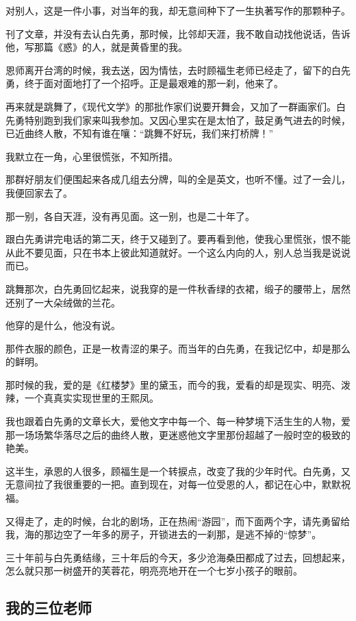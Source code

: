 \par 对别人，这是一件小事，对当年的我，却无意间种下了一生执著写作的那颗种子。
\par 刊了文章，并没有去认白先勇，那时候，比邻却天涯，我不敢自动找他说话，告诉他，写那篇《惑》的人，就是黄昏里的我。
\par 恩师离开台湾的时候，我去送，因为情怯，去时顾福生老师已经走了，留下的白先勇，终于面对面地打了一个招呼。正是最艰难的那一刹，他来了。
\par 再来就是跳舞了，《现代文学》的那批作家们说要开舞会，又加了一群画家们。白先勇特别跑到我们家来叫我参加。又因心里实在是太怕了，鼓足勇气进去的时候，已近曲终人散，不知有谁在嚷：“跳舞不好玩，我们来打桥牌！”
\par 我默立在一角，心里很慌张，不知所措。
\par 那群好朋友们便围起来各成几组去分牌，叫的全是英文，也听不懂。过了一会儿，我便回家去了。
\par 那一别，各自天涯，没有再见面。这一别，也是二十年了。
\par 跟白先勇讲完电话的第二天，终于又碰到了。要再看到他，使我心里慌张，恨不能从此不要见面，只在书本上彼此知道就好。一个这么内向的人，别人总当我是说说而已。
\par 跳舞那次，白先勇回忆起来，说我穿的是一件秋香绿的衣裙，缎子的腰带上，居然还别了一大朵绒做的兰花。
\par 他穿的是什么，他没有说。
\par 那件衣服的颜色，正是一枚青涩的果子。而当年的白先勇，在我记忆中，却是那么的鲜明。
\par 那时候的我，爱的是《红楼梦》里的黛玉，而今的我，爱看的却是现实、明亮、泼辣，一个真真实实现世里的王熙凤。
\par 我也跟着白先勇的文章长大，爱他文字中每一个、每一种梦境下活生生的人物，爱那一场场繁华落尽之后的曲终人散，更迷惑他文字里那份超越了一般时空的极致的艳美。
\par 这半生，承恩的人很多，顾福生是一个转捩点，改变了我的少年时代。白先勇，又无意间拉了我很重要的一把。直到现在，对每一位受恩的人，都记在心中，默默祝福。
\par 又得走了，走的时候，台北的剧场，正在热闹“游园”，而下面两个字，请先勇留给我，海的那边空了一年多的房子，开锁进去的一刹那，是逃不掉的“惊梦”。
\par 三十年前与白先勇结缘，三十年后的今天，多少沧海桑田都成了过去，回想起来，怎么就只那一树盛开的芙蓉花，明亮亮地开在一个七岁小孩子的眼前。




\subsection{我的三位老师}


